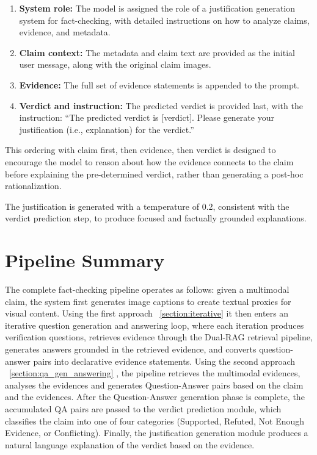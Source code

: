 \begin{enumerate}
    \item \textbf{System role:} The model is assigned the role of a justification generation system for fact-checking, with detailed instructions on how to analyze claims, evidence, and metadata.
    \item \textbf{Claim context:} The metadata and claim text are provided as the initial user message, along with the original claim images.
    \item \textbf{Evidence:} The full set of evidence statements is appended to the prompt.
    \item \textbf{Verdict and instruction:} The predicted verdict is provided last, with the instruction: ``The predicted verdict is [verdict]. Please generate your justification (i.e., explanation) for the verdict.''
\end{enumerate}

This ordering with claim first, then evidence, then verdict is designed to encourage the model to reason about how the evidence connects to the claim before explaining the pre-determined verdict, rather than generating a post-hoc rationalization.

The justification is generated with a temperature of 0.2, consistent with the verdict prediction step, to produce focused and factually grounded explanations.

\section{Pipeline Summary}

The complete fact-checking pipeline operates as follows: given a multimodal claim, the system first generates image captions to create textual proxies for visual content. Using the first approach ~\ref{section:iterative} it then enters an iterative question generation and answering loop, where each iteration produces verification questions, retrieves evidence through the Dual-RAG retrieval pipeline, generates answers grounded in the retrieved evidence, and converts question-answer pairs into declarative evidence statements. Using the second approach ~\ref{section:qa_gen_answering} , the pipeline retrieves the multimodal evidences, analyses the evidences and generates Question-Answer pairs based on the claim and the evidences. After the Question-Answer generation phase is complete, the accumulated QA pairs are passed to the verdict prediction module, which classifies the claim into one of four categories (Supported, Refuted, Not Enough Evidence, or Conflicting). Finally, the justification generation module produces a natural language explanation of the verdict based on the evidence.

